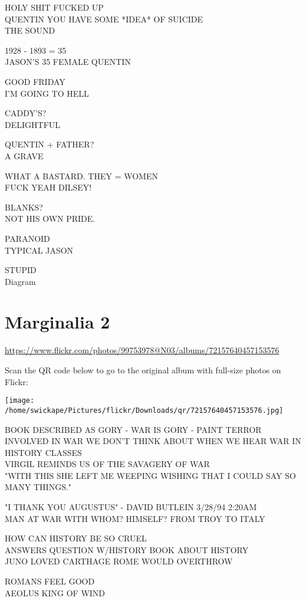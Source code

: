 \documentclass[10pt,letterpaper]{article}
\begin{document}
HOLY SHIT FUCKED UP\\
QUENTIN YOU HAVE SOME *IDEA* OF SUICIDE\\
THE SOUND

1928 {-} 1893 = 35\\
JASON'S 35 FEMALE QUENTIN

GOOD FRIDAY\\
I'M GOING TO HELL

CADDY'S?\\
DELIGHTFUL

QUENTIN + FATHER?\\
A GRAVE

WHAT A BASTARD.  THEY = WOMEN\\
FUCK YEAH DILSEY!

BLANKS?\\
NOT HIS OWN PRIDE.

PARANOID\\
TYPICAL JASON

STUPID\\
Diagram
\pagebreak

\section*{Marginalia 2}

\url{https://www.flickr.com/photos/99753978@N03/albums/72157640457153576}

Scan the QR code below to go to the original album with full-size photos on Flickr:

\texttt{[image: /home/swickape/Pictures/flickr/Downloads/qr/72157640457153576.jpg]}
\pagebreak

BOOK DESCRIBED AS GORY {-} WAR IS GORY {-} PAINT TERROR INVOLVED IN WAR WE DON'T THINK ABOUT WHEN WE HEAR WAR IN HISTORY CLASSES\\
VIRGIL REMINDS US OF THE SAVAGERY OF WAR\\
"WITH THIS SHE LEFT ME WEEPING WISHING THAT I COULD SAY SO MANY THINGS."

"I THANK YOU AUGUSTUS" {-} DAVID BUTLEIN 3/28/94 2:20AM\\
MAN AT WAR WITH WHOM? HIMSELF? FROM TROY TO ITALY

HOW CAN HISTORY BE SO CRUEL\\
ANSWERS QUESTION W/HISTORY BOOK ABOUT HISTORY\\
JUNO LOVED CARTHAGE ROME WOULD OVERTHROW

ROMANS FEEL GOOD\\
AEOLUS KING OF WIND
\end{document}
